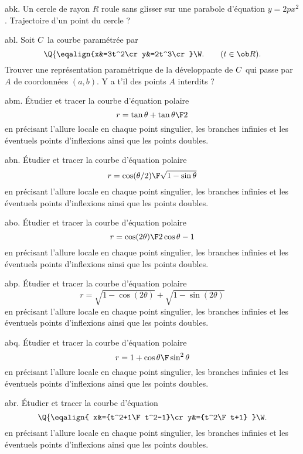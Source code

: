 \exo [Level=2,Fight=2,Learn=1,Field=\Roulement,Type=\Exercices,Origin=] abk. 
Un cercle de rayon $R$ roule sans glisser sur 
une parabole d'équation $y=2px^2$. 
Trajectoire d'un point du cercle ?

\exo [Level=2,Fight=1,Learn=1,Field=\Développantes,Type=\Exercices,Origin=] abl. 
Soit $\sc C$ la courbe paramétrée par $$
\Q\{\eqalign{x&=3t^2\cr y&=2t^3\cr}\W.\qquad(t\in\ob R).
$$
Trouver une représentation paramétrique de la développante de $\sc C$ 
qui passe par $A$ de coordonnées $(a,b)$. Y a t'il des points $A$ interdits ?

\exo [Level=1,Fight=1,Learn=2,Field=\CourbesParamétréesPolaires,Type=\Exercices,Origin=] abm. 
Étudier et tracer la courbe d'équation polaire 
$$
r=\tan\theta+\tan{\theta\F2}
$$ 
en précisant l'allure  locale en chaque point singulier, les branches infinies 
et les éventuels points d'inflexions ainsi que les points doubles. 

\exo [Level=1,Fight=1,Learn=2,Field=\CourbesParamétréesPolaires,Type=\Exercices,Origin=] abn. 
Étudier et tracer la courbe d'équation polaire 
$$
r={\cos(\theta/2)\F\sqrt{1-\sin\theta}}
$$ 
en précisant l'allure  locale en chaque point singulier, les branches infinies 
et les éventuels points d'inflexions ainsi que les points doubles. 

\exo [Level=1,Fight=1,Learn=2,Field=\CourbesParamétréesPolaires,Type=\Exercices,Origin=] abo. 
Étudier et tracer la courbe d'équation polaire 
$$
r={\cos(2\theta)\F2\cos\theta-1}
$$ 
en précisant l'allure  locale en chaque point singulier, les branches infinies 
et les éventuels points d'inflexions ainsi que les points doubles. 

\exo [Level=1,Fight=1,Learn=2,Field=\CourbesParamétréesPolaires,Type=\Exercices,Origin=] abp. 
Étudier et tracer la courbe d'équation polaire 
$$
r=\sqrt{1-\cos(2\theta)}+\sqrt{1-\sin(2\theta)}
$$ 
en précisant l'allure  locale en chaque point singulier, les branches infinies 
et les éventuels points d'inflexions ainsi que les points doubles. 

\exo [Level=1,Fight=1,Learn=2,Field=\CourbesParamétréesPolaires,Type=\Exercices,Origin=] abq. 
Étudier et tracer la courbe d'équation polaire 
$$
r={1+\cos\theta\F\sin^2\theta}
$$ 
en précisant l'allure  locale en chaque point singulier, les branches infinies 
et les éventuels points d'inflexions ainsi que les points doubles. 


\exo [Level=1,Fight=0,Learn=1,Field=\CourbesParamétréesCartésiennes,Type=\Exercices,Origin=] abr. 
Étudier et tracer la courbe d'équation 
$$
\Q\{\eqalign{
x&={t^2+1\F t^2-1}\cr
y&={t^2\F t+1}
}\W.
$$ 
en précisant l'allure  locale en chaque point singulier, les branches infinies 
et les éventuels points d'inflexions ainsi que les points doubles. 

